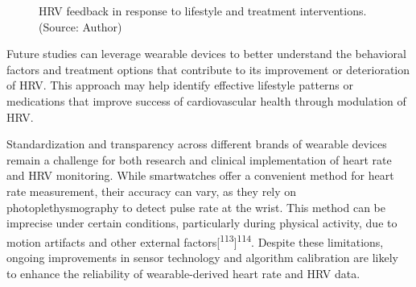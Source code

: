 \documentclass[
  a4paper,
  headsepline=true,
  open=any]{scrbook}
\begin{document}
\begin{figure}

\begin{minipage}[t]{\linewidth}

{\centering 


\caption{HRV feedback in response to lifestyle and treatment
interventions. (Source: Author)}

}

\end{minipage}%

\end{figure}

Future studies can leverage wearable devices to better understand the
behavioral factors and treatment options that contribute to its
improvement or deterioration of HRV. This approach may help identify
effective lifestyle patterns or medications that improve success of
cardiovascular health through modulation of HRV.

Standardization and transparency across different brands of wearable
devices remain a challenge for both research and clinical implementation
of heart rate and HRV monitoring. While smartwatches offer a convenient
method for heart rate measurement, their accuracy can vary, as they rely
on photoplethysmography to detect pulse rate at the wrist. This method
can be imprecise under certain conditions, particularly during physical
activity, due to motion artifacts and other external
factors{[}\textsuperscript{113}{]}\textsuperscript{114}. Despite these
limitations, ongoing improvements in sensor technology and algorithm
calibration are likely to enhance the reliability of wearable-derived
heart rate and HRV data.
\end{document}
